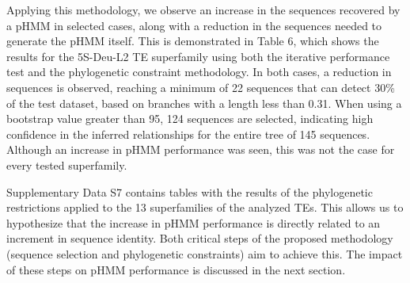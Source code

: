 \documentclass[unnumsec,webpdf,contemporary,large]{oup-authoring-template}%
\theoremstyle{thmstyleone}%
\theoremstyle{thmstyletwo}%
\theoremstyle{thmstylethree}%
\begin{document}
Applying this methodology, we observe an increase in the sequences recovered by
a pHMM in selected cases, along with a reduction in the sequences needed to
generate the pHMM itself. This is demonstrated in Table 6, which shows the
results for the 5S-Deu-L2 TE superfamily using both the iterative performance
test and the phylogenetic constraint methodology. In both cases, a reduction in
sequences is observed, reaching a minimum of 22 sequences that can detect 30\%
of the test dataset, based on branches with a length less than 0.31. When using
a bootstrap value greater than 95, 124 sequences are selected, indicating high
confidence in the inferred relationships for the entire tree of 145 sequences.
Although an increase in pHMM performance was seen, this was not the case for
every tested superfamily.

Supplementary Data S7 contains tables with the results of the phylogenetic
restrictions applied to the 13 superfamilies of the analyzed TEs. This allows us
to hypothesize that the increase in pHMM performance is directly related to an
increment in sequence identity. Both critical steps of the proposed methodology
(sequence selection and phylogenetic constraints) aim to achieve this. The
impact of these steps on pHMM performance is discussed in the next section.
\end{document}

